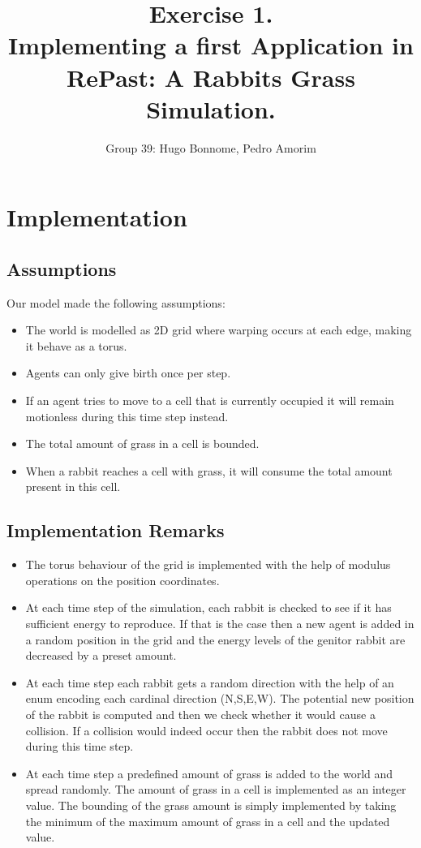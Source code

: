 \documentclass[11pt]{article}
\title{\bf Exercise 1.\\ Implementing a first Application in RePast: A Rabbits Grass Simulation.}
\author{Group 39: Hugo Bonnome, Pedro Amorim}
\begin{document}
\maketitle

\section{Implementation}

\subsection{Assumptions}
Our model made the following assumptions:
\begin{itemize}
\item The world is modelled as 2D grid where warping occurs at each edge, making
  it behave as a torus.
\item Agents can only give birth once per step.
\item If an agent tries to move to a cell that is currently occupied it will
  remain motionless during this time step instead.
\item The total amount of grass in a cell is bounded.
\item When a rabbit reaches a cell with grass, it will consume the total amount present in this cell.
\end{itemize}

\subsection{Implementation Remarks}
\begin{itemize}
\item The torus behaviour of the grid is implemented with the help of modulus
  operations on the position coordinates.
\item At each time step of the simulation, each rabbit is checked to see if
  it has sufficient energy to reproduce. If that is the case then a new
  agent is added in a random position in the grid and the energy levels of
  the genitor rabbit are decreased by a preset amount.
\item At each time step each rabbit gets a random direction with the help of an
  enum encoding each cardinal direction (N,S,E,W). The potential new position of
  the rabbit is computed and then we check whether it would cause a collision.
  If a collision would indeed occur then the rabbit does not move during this
  time step.
\item At each time step a predefined amount of grass is added to the world and
  spread randomly. The amount of grass in a cell is implemented as an integer
  value. The bounding of the grass amount is simply implemented by taking the
  minimum of the maximum amount of grass in a cell and the updated value.
\end{itemize}
  
\end{document}
